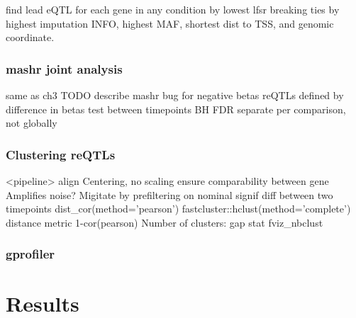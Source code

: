\begin{outline}
\1 find lead eQTL for each gene in any condition by lowest lfsr
    \2 breaking ties by highest imputation INFO, highest \gls{MAF}, shortest dist to \gls{TSS}, and genomic coordinate.

\subsubsection{mashr joint analysis}

\1 same as ch3
    \2 TODO describe mashr bug for negative betas
    \2 reQTLs defined by difference in betas test between timepoints
    \2 BH FDR separate per comparison, not globally

\subsubsection{Clustering reQTLs}


\1 <pipeline>
    \2 align
    \2 Centering, no scaling
        \3 ensure comparability between gene
        \3 Amplifies noise? Migitate by prefiltering on nominal signif diff between two timepoints
    \2 dist\_cor(method='pearson')
    \2 fastcluster::hclust(method='complete')
    \2 distance metric 1-cor(pearson)
    \2 Number of clusters: gap stat fviz\_nbclust

\subsubsection{gprofiler}

\section{Results}


\end{outline}
